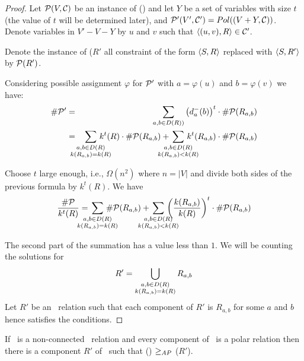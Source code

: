 \begin{proof}
Let \(\mathcal{P}(V,\mathcal{C})\) be an instance of \ccsp(\mR) and let \(Y\) be a set of variables 
with size \(t\) (the value of \(t\) will be determined later), and 
\(\mathcal{P}'(V',\mathcal{C}') = Pol((V+Y,\mathcal{C}))\).
Denote variables in \(V' - V - Y\) by \(u\) and \(v\) such that \(\langle (u,v),R \rangle\in \mathcal{C}'\)\@.

Denote the instance of \ccsp(\(R'\) all constraint of the form \(\langle S,R \rangle\)
replaced with \(\langle S,R' \rangle\) by \(\mathcal{P}(R')\)\@.

Considering possible assignment \(\varphi\) for \(\mathcal{P}'\) with
\(a = \varphi(u)\) and \(b = \varphi(v)\) we have:
\begin{eqnarray*}
\#\probi' &=& 
\sum_{a,b\in D(R))}\left(\dmab\right)^ t \cdot
\#\probi(R_{a,b})\\
 &=& 
\bigsum{\substack{a,b\in D(R) \\
\magf(R_{a,b})=\magf(R)}} 
\magf^t(R) \cdot \#\probi(R_{a,b})+
\bigsum{\substack{a,b\in D(R) \\ \magf(R_{a,b})  < \magf(R)}}k^t
(R_{a,b})\cdot\#\probi(R_{a,b})
\end{eqnarray*}

Choose \(t\) large enough, i.e., \(\Omega(n^2)\) where \(n=|V|\) and divide both
sides of the previous formula by \(k^t(R)\)\@. We have
\[\frac{\#\probi}{\magf^t(R)} =  
\bigsum{\substack{a,b\in D(R) \\ \magf(R_{a,b})=\magf(R)}} 
\#\probi(R_{a,b}) + 
\bigsum{\substack{a,b\in D(R) \\\magf(R_{a,b})<\magf(R)}}
\left(\frac{\magf(R_{a,b})}{\magf(R)} \right )^t
\cdot\#\probi(R_{a,b})
\]

The second part of the summation has a value less than \(1\). 
We will be counting the solutions for 
\[R'=\bigcup_{\substack{a,b\in D(R) \\
k(R_{a,b})=k(R)}} R_{a,b}\]
Let \(R'\) be an \RBA\ relation such that each component of \(R'\) 
is \(R_{a,b}\) for some \(a\) and \(b\) hence satisfies the conditions.
\end{proof}


\begin{lemma} \label{lem:connected}
If \mR\ is a non-connected \RBA\ relation and every component of 
\mR\ is a polar relation then there is a component \(R'\) of \mR\ 
such that \ccsp(\mR) \(\ge_{AP}\) \ccsp(\(R'\)).
\end{lemma}



